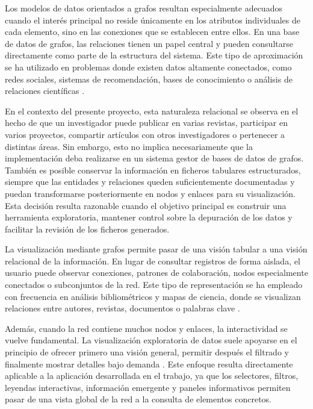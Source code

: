 \documentclass[11pt,spanish,listoffigures,listoftables]{tfgetsinf}
\begin{document}
Los modelos de datos orientados a grafos resultan especialmente adecuados cuando el interés principal no reside únicamente en los atributos individuales de cada elemento, sino en las conexiones que se establecen entre ellos. En una base de datos de grafos, las relaciones tienen un papel central y pueden consultarse directamente como parte de la estructura del sistema. Este tipo de aproximación se ha utilizado en problemas donde existen datos altamente conectados, como redes sociales, sistemas de recomendación, bases de conocimiento o análisis de relaciones científicas \cite{angles,robinson}.

En el contexto del presente proyecto, esta naturaleza relacional se observa en el hecho de que un investigador puede publicar en varias revistas, participar en varios proyectos, compartir artículos con otros investigadores o pertenecer a distintas áreas. Sin embargo, esto no implica necesariamente que la implementación deba realizarse en un sistema gestor de bases de datos de grafos. También es posible conservar la información en ficheros tabulares estructurados, siempre que las entidades y relaciones queden suficientemente documentadas y puedan transformarse posteriormente en nodos y enlaces para su visualización. Esta decisión resulta razonable cuando el objetivo principal es construir una herramienta exploratoria, mantener control sobre la depuración de los datos y facilitar la revisión de los ficheros generados.

La visualización mediante grafos permite pasar de una visión tabular a una visión relacional de la información. En lugar de consultar registros de forma aislada, el usuario puede observar conexiones, patrones de colaboración, nodos especialmente conectados o subconjuntos de la red. Este tipo de representación se ha empleado con frecuencia en análisis bibliométricos y mapas de ciencia, donde se visualizan relaciones entre autores, revistas, documentos o palabras clave \cite{eck,cobo}.

Además, cuando la red contiene muchos nodos y enlaces, la interactividad se vuelve fundamental. La visualización exploratoria de datos suele apoyarse en el principio de ofrecer primero una visión general, permitir después el filtrado y finalmente mostrar detalles bajo demanda \cite{shneiderman}. Este enfoque resulta directamente aplicable a la aplicación desarrollada en el trabajo, ya que los selectores, filtros, leyendas interactivas, información emergente y paneles informativos permiten pasar de una vista global de la red a la consulta de elementos concretos.
\end{document}
